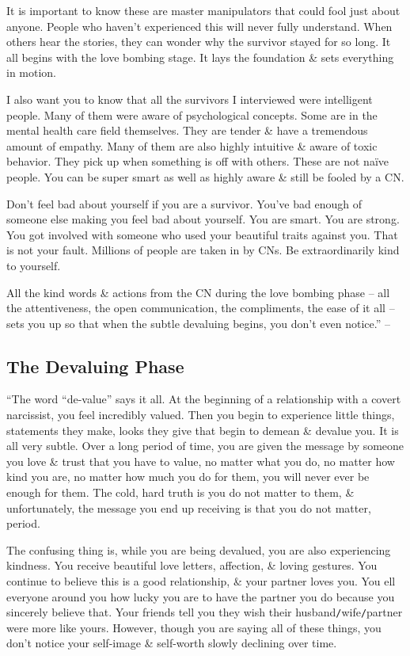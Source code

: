 \documentclass{article}
\numberwithin{equation}{section}
\begin{document}
It is important to know these are master manipulators that could fool just about anyone. People who haven't experienced this will never fully understand. When others hear the stories, they can wonder why the survivor stayed for so long. It all begins with the love bombing stage. It lays the foundation \& sets everything in motion.

I also want you to know that all the survivors I interviewed were intelligent people. Many of them were aware of psychological concepts. Some are in the mental health care field themselves. They are tender \& have a tremendous amount of empathy. Many of them are also highly intuitive \& aware of toxic behavior. They pick up when something is off with others. These are not na\"ive people. You can be super smart as well as highly aware \& still be fooled by a CN.

Don't feel bad about yourself if you are a survivor. You've bad enough of someone else making you feel bad about yourself. You are smart. You are strong. You got involved with someone who used your beautiful traits against you. That is not your fault. Millions of people are taken in by CNs. Be extraordinarily kind to yourself.

All the kind words \& actions from the CN during the love bombing phase -- all the attentiveness, the open communication, the compliments, the ease of it all -- sets you up so that when the subtle devaluing begins, you don't even notice.'' -- \cite[pp. 32--36]{Mirza2017}

\subsection{The Devaluing Phase}
``The word ``de-value'' says it all. At the beginning of a relationship with a covert narcissist, you feel incredibly valued. Then you begin to experience little things, statements they make, looks they give that begin to demean \& devalue you. It is all very subtle. Over a long period of time, you are given the message by someone you love \& trust that you have to value, no matter what you do, no matter how kind you are, no matter how much you do for them, you will never ever be enough for them. The cold, hard truth is you do not matter to them, \& unfortunately, the message you end up receiving is that you do not matter, period.

The confusing thing is, while you are being devalued, you are also experiencing kindness. You receive beautiful love letters, affection, \& loving gestures. You continue to believe this is a good relationship, \& your partner loves you. You ell everyone around you how lucky you are to have the partner you do because you sincerely believe that. Your friends tell you they wish their husband\texttt{/}wife\texttt{/}partner were more like yours. However, though you are saying all of these things, you don't notice your self-image \& self-worth slowly declining over time.
\end{document}
